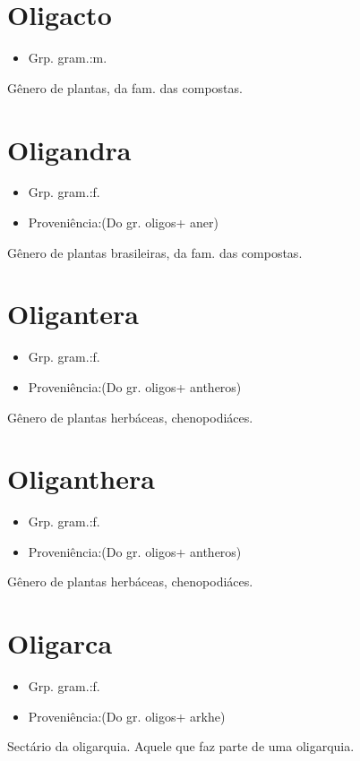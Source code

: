 \section{Oligacto}
\begin{itemize}
\item {Grp. gram.:m.}
\end{itemize}
Gênero de plantas, da fam. das compostas.
\section{Oligandra}
\begin{itemize}
\item {Grp. gram.:f.}
\end{itemize}
\begin{itemize}
\item {Proveniência:(Do gr. \textunderscore oligos\textunderscore  + \textunderscore aner\textunderscore )}
\end{itemize}
Gênero de plantas brasileiras, da fam. das compostas.
\section{Oligantera}
\begin{itemize}
\item {Grp. gram.:f.}
\end{itemize}
\begin{itemize}
\item {Proveniência:(Do gr. \textunderscore oligos\textunderscore  + \textunderscore antheros\textunderscore )}
\end{itemize}
Gênero de plantas herbáceas, chenopodiáces.
\section{Oliganthera}
\begin{itemize}
\item {Grp. gram.:f.}
\end{itemize}
\begin{itemize}
\item {Proveniência:(Do gr. \textunderscore oligos\textunderscore  + \textunderscore antheros\textunderscore )}
\end{itemize}
Gênero de plantas herbáceas, chenopodiáces.
\section{Oligarca}
\begin{itemize}
\item {Grp. gram.:f.}
\end{itemize}
\begin{itemize}
\item {Proveniência:(Do gr. \textunderscore oligos\textunderscore  + \textunderscore arkhe\textunderscore )}
\end{itemize}
Sectário da oligarquia.
Aquele que faz parte de uma oligarquia.
